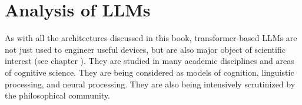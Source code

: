 

%
%
% 
%
%
%
%

\section{Analysis of LLMs}\label{llm_analsis}

As with all the architectures discussed in this book, transformer-based LLMs are not just used to engineer useful devices, but are also major object of scientific interest (see chapter ). They are studied in many academic disciplines and areas of cognitive science. They are being considered as models of cognition, linguistic processing, and neural processing. They are also being intensively scrutinized by the philosophical community.


